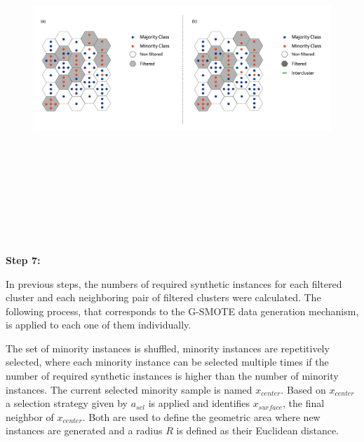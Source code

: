 \documentclass[parskip=full]{scrartcl}
\begin{document}
\begin{figure}[H]
	\centering
	\includegraphics[width=18cm,height=13cm, keepaspectratio]{../analysis/fig5.png}
	\label{fig:Somo_Overview}
\end{figure}

\textbf{Step 7:}

In previous steps, the numbers of required synthetic instances for each filtered cluster and each neighboring pair of filtered clusters were calculated. The following process, that corresponds to the G-SMOTE data generation mechanism, is applied to each one of them individually.

The set of minority instances is shuffled, minority instances are repetitively selected, where each minority instance can be selected multiple times if the number of required synthetic instances is higher than the number of minority instances. The current selected minority sample is named $x_{center}$. Based on $x_{center}$ a selection strategy given by $a_{sel}$ is applied and identifies $x_{surface}$, the final neighbor of $x_{center}$. Both are used to define the geometric area where new instances are generated and a radius $R$ is defined as their Euclidean distance.
\end{document}
